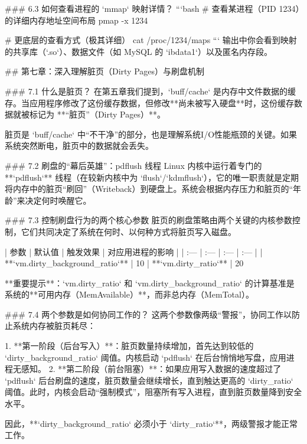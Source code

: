 ### 6.3 如何查看进程的 `mmap` 映射详情？
```bash
# 查看某进程（PID 1234）的详细内存地址空间布局
pmap -x 1234

# 更底层的查看方式（极其详细）
cat /proc/1234/maps
```
输出中你会看到映射的共享库（`.so`）、数据文件（如 MySQL 的 `ibdata1`）以及匿名内存段。


## 第七章：深入理解脏页（Dirty Pages）与刷盘机制

### 7.1 什么是脏页？
在第五章我们提到，`buff/cache` 是内存中文件数据的缓存。当应用程序修改了这份缓存数据，但修改**尚未被写入硬盘**时，这份缓存数据就被标记为 **“脏页”（Dirty Pages）**。

脏页是 `buff/cache` 中“不干净”的部分，也是理解系统I/O性能瓶颈的关键。如果系统突然断电，脏页中的数据就会丢失。

### 7.2 刷盘的“幕后英雄”：pdflush 线程
Linux 内核中运行着专门的 **`pdflush`** 线程（在较新内核中为 `flush`/`kdmflush`），它的唯一职责就是定期将内存中的脏页“刷回”（Writeback）到硬盘上。系统会根据内存压力和脏页的“年龄”来决定何时唤醒它。

### 7.3 控制刷盘行为的两个核心参数
脏页的刷盘策略由两个关键的内核参数控制，它们共同决定了系统在何时、以何种方式将脏页写入磁盘。

| 参数 | 默认值 | 触发效果 | 对应用进程的影响 |
| :--- | :--- | :--- | :--- |
| **`vm.dirty_background_ratio`** | 10%
| **`vm.dirty_ratio`** | 20%

**重要提示**：`vm.dirty_ratio` 和 `vm.dirty_background_ratio` 的计算基准是系统的**可用内存（MemAvailable）**，而非总内存（MemTotal）。

### 7.4 两个参数是如何协同工作的？
这两个参数像两级“警报”，协同工作以防止系统内存被脏页耗尽：

1.  **第一阶段（后台写入）**：脏页数量持续增加，首先达到较低的 `dirty_background_ratio` 阈值。内核启动 `pdflush` 在后台悄悄地写盘，应用进程无感知。
2.  **第二阶段（前台阻塞）**：如果应用写入数据的速度超过了 `pdflush` 后台刷盘的速度，脏页数量会继续增长，直到触达更高的 `dirty_ratio` 阈值。此时，内核会启动“强制模式”，阻塞所有写入进程，直到脏页数量降到安全水平。

因此，**`dirty_background_ratio` 必须小于 `dirty_ratio`**，两级警报才能正常工作。

